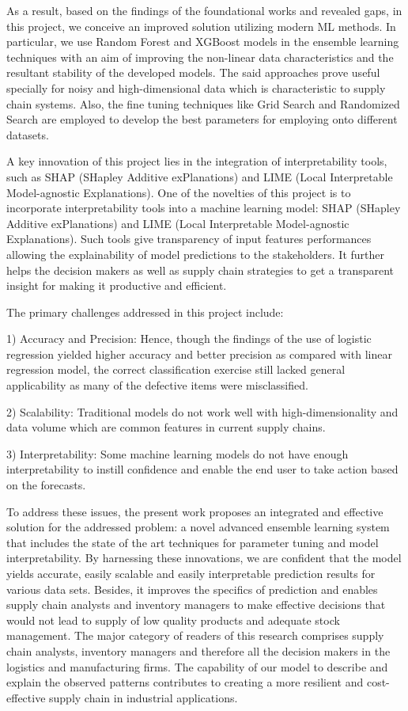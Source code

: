 \documentclass[conference]{IEEEtran}
\begin{document}
As a result, based on the findings of the foundational works and revealed gaps, in this project, we conceive an improved solution utilizing modern ML methods. In particular, we use Random Forest and XGBoost models in the ensemble learning techniques with an aim of improving the non-linear data characteristics and the resultant stability of the developed models. The said approaches prove useful specially for noisy and high-dimensional data which is characteristic to supply chain systems. Also, the fine tuning techniques like Grid Search and Randomized Search are employed to develop the best parameters for employing onto different datasets.

A key innovation of this project lies in the integration of interpretability tools, such as SHAP (SHapley Additive exPlanations) and LIME (Local Interpretable Model-agnostic Explanations). One of the novelties of this project is to incorporate interpretability tools into a machine learning model: SHAP (SHapley Additive exPlanations) and LIME (Local Interpretable Model-agnostic Explanations). Such tools give transparency of input features performances allowing the explainability of model predictions to the stakeholders. It further helps the decision makers as well as supply chain strategies to get a transparent insight for making it productive and efficient.

The primary challenges addressed in this project include:

1) Accuracy and Precision: Hence, though the findings of the use of logistic regression yielded higher accuracy and better precision as compared with linear regression model, the correct classification exercise still lacked general applicability as many of the defective items were misclassified.

2) Scalability: Traditional models do not work well with high-dimensionality and data volume which are common features in current supply chains.

3) Interpretability: Some machine learning models do not have enough interpretability to instill confidence and enable the end user to take action based on the forecasts.

To address these issues, the present work proposes an integrated and effective solution for the addressed problem: a novel advanced ensemble learning system that includes the state of the art techniques for parameter tuning and model interpretability. By harnessing these innovations, we are confident that the model yields accurate, easily scalable and easily interpretable prediction results for various data sets. Besides, it improves the specifics of prediction and enables supply chain analysts and inventory managers to make effective decisions that would not lead to supply of low quality products and adequate stock management. The major category of readers of this research comprises supply chain analysts, inventory managers and therefore all the decision makers in the logistics and manufacturing firms. The capability of our model to describe and explain the observed patterns contributes to creating a more resilient and cost-effective supply chain in industrial applications.
\end{document}

